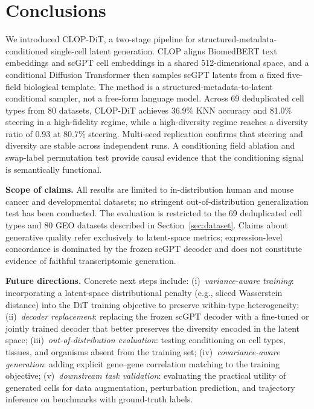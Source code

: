 \documentclass[biology,article,submit,pdftex,moreauthors]{Definitions/mdpi}
\begin{document}
\section{Conclusions}\label{sec:conclusions}

We introduced CLOP-DiT, a two-stage pipeline for structured-metadata-conditioned single-cell latent generation. CLOP aligns BiomedBERT text embeddings and scGPT cell embeddings in a shared 512-dimensional space, and a conditional Diffusion Transformer then samples scGPT latents from a fixed five-field biological template. The method is a structured-metadata-to-latent conditional sampler, not a free-form language model. Across 69 deduplicated cell types from 80 datasets, CLOP-DiT achieves 36.9\% KNN accuracy and 81.0\% steering in a high-fidelity regime, while a high-diversity regime reaches a diversity ratio of 0.93 at 80.7\% steering. Multi-seed replication confirms that steering and diversity are stable across independent runs. A conditioning field ablation and swap-label permutation test provide causal evidence that the conditioning signal is semantically functional.

\textbf{Scope of claims.} All results are limited to in-distribution human and mouse cancer and developmental datasets; no stringent out-of-distribution generalization test has been conducted. The evaluation is restricted to the 69 deduplicated cell types and 80 GEO datasets described in Section~\ref{sec:dataset}. Claims about generative quality refer exclusively to latent-space metrics; expression-level concordance is dominated by the frozen scGPT decoder and does not constitute evidence of faithful transcriptomic generation.

\textbf{Future directions.} Concrete next steps include: (i)~\emph{variance-aware training}: incorporating a latent-space distributional penalty (e.g., sliced Wasserstein distance) into the DiT training objective to preserve within-type heterogeneity; (ii)~\emph{decoder replacement}: replacing the frozen scGPT decoder with a fine-tuned or jointly trained decoder that better preserves the diversity encoded in the latent space; (iii)~\emph{out-of-distribution evaluation}: testing conditioning on cell types, tissues, and organisms absent from the training set; (iv)~\emph{covariance-aware generation}: adding explicit gene--gene correlation matching to the training objective; (v)~\emph{downstream task validation}: evaluating the practical utility of generated cells for data augmentation, perturbation prediction, and trajectory inference on benchmarks with ground-truth labels.
\end{document}
